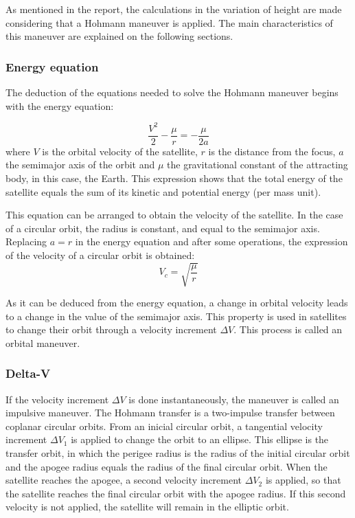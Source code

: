 As mentioned in the report, the calculations in the variation of height are made considering that a Hohmann maneuver is applied. The main characteristics of this maneuver are explained on the following sections.

\subsubsection{Energy equation}
The deduction of the equations needed to solve the Hohmann maneuver begins with the energy equation:

\begin{equation}
\frac{V^2}{2}-\frac{\mu}{r}=-\frac{\mu}{2a}
\end{equation}
where $V$ is the orbital velocity of the satellite, $r$ is the distance from the focus, $a$ the semimajor axis of the orbit and $\mu$ the gravitational constant of the attracting body, in this case, the Earth. This expression shows that the total energy of the satellite equals the sum of its kinetic  and potential energy (per mass unit).

This equation can be arranged to obtain the velocity of the satellite. In the case of a circular orbit, the radius is constant, and equal to the semimajor axis. Replacing $a=r$ in the energy equation and after some operations, the expression of the velocity of a circular orbit is obtained:
\begin{equation}
V_{c}=\sqrt{\frac{\mu}{r}}
\end{equation}

As it can be deduced from the energy equation, a change in orbital velocity leads to a change in the value of the semimajor axis. This property is used in satellites to change their orbit through a velocity increment $\Delta V$. This process is called an orbital maneuver.

\subsubsection{Delta-V}
If the velocity increment $\Delta V$ is done instantaneously, the maneuver is called an impulsive maneuver. The Hohmann transfer is a two-impulse transfer between coplanar circular orbits. From an inicial circular orbit, a tangential velocity increment $\Delta V_{1}$ is applied to change the orbit to an ellipse. This ellipse is the transfer orbit, in which the perigee radius is the radius of the initial circular orbit and the apogee radius equals the radius of the final circular orbit. When the satellite reaches the apogee, a second velocity increment $\Delta V_{2}$ is applied, so that the satellite reaches the final circular orbit with the apogee radius. If this second velocity is not applied, the satellite will remain in the elliptic orbit.

